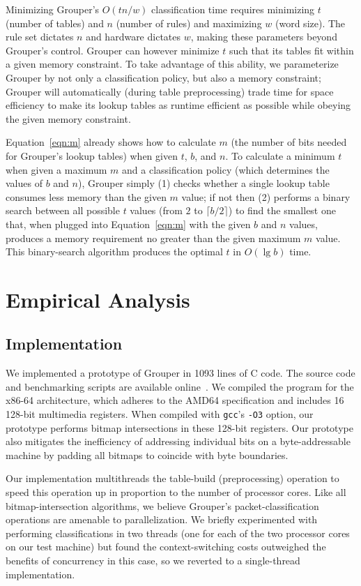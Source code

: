 \documentclass[10pt, conference, compsocconf]{IEEEtran}
\begin{document}
Minimizing Grouper's $O(tn/w)$ classification time requires minimizing $t$
(number of tables) and $n$ (number of rules) and maximizing $w$ (word size).
The rule set dictates $n$ and hardware dictates $w$, making these parameters
beyond Grouper's control.  Grouper can however minimize $t$ such that its tables
fit within a given memory constraint. To take advantage of this ability, we
parameterize Grouper by not only a classification policy, but also a memory
constraint; Grouper will automatically (during table preprocessing) trade time
for space efficiency to make its lookup tables as runtime efficient as possible
while obeying the given memory constraint.

Equation~\ref{eqn:m} already shows how to calculate $m$ (the number of bits
needed for Grouper's lookup tables) when given $t$, $b$, and $n$.  To calculate
a minimum $t$ when given a maximum $m$ and a classification policy (which
determines the values of $b$ and $n$), Grouper simply (1) checks whether a
single lookup table consumes less memory than the given $m$ value; if not then
(2) performs a binary search between all possible $t$ values (from $2$ to
$\lceil b/2\rceil$) to find the smallest one that, when plugged into
Equation~\ref{eqn:m} with the given $b$ and $n$ values, produces a memory
requirement no greater than the given maximum $m$ value.  This binary-search
algorithm produces the optimal $t$ in $O(\lg b)$ time.

\section{Empirical Analysis}
\label{sec:tests}

\subsection{Implementation}
We implemented a prototype of Grouper in 1093 lines of C code. The source code
and benchmarking scripts are available online~\cite{webpage}.  We compiled the
program for the x86-64 architecture, which adheres to the AMD64 specification
and includes 16 128-bit multimedia registers.  When compiled with {\tt gcc}'s
\texttt{-O3} option, our prototype performs bitmap intersections in these
128-bit registers.  Our prototype also mitigates the inefficiency of addressing
individual bits on a byte-addressable machine by padding all bitmaps to coincide
with byte boundaries.

Our implementation multithreads the table-build (preprocessing) operation to
speed this operation up in proportion to the number of processor cores.  Like
all bitmap-intersection algorithms, we believe Grouper's packet-classification
operations are amenable to parallelization.  We briefly experimented with
performing classifications in two threads (one for each of the two processor
cores on our test machine) but found the context-switching costs outweighed the
benefits of concurrency in this case, so we reverted to a single-thread
implementation.
\end{document}
